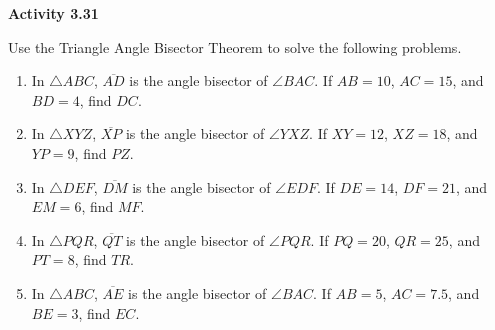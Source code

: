\vspace{0.3ex}
\noindent\textbf{Activity 3.31}

\vspace{0.2ex}

Use the Triangle Angle Bisector Theorem to solve the following problems.

\begin{enumerate}[label=\color{blue}\arabic*.]
    \item In \(\triangle ABC\), \(\overline{AD}\) is the angle bisector of \(\angle BAC\). If \(AB = 10\), \(AC = 15\), and \(BD = 4\), find \(DC\).
    \item In \(\triangle XYZ\), \(\overline{XP}\) is the angle bisector of \(\angle YXZ\). If \(XY = 12\), \(XZ = 18\), and \(YP = 9\), find \(PZ\).
    \item In \(\triangle DEF\), \(\overline{DM}\) is the angle bisector of \(\angle EDF\). If \(DE = 14\), \(DF = 21\), and \(EM = 6\), find \(MF\).
    \item In \(\triangle PQR\), \(\overline{QT}\) is the angle bisector of \(\angle PQR\). If \(PQ = 20\), \(QR = 25\), and \(PT = 8\), find \(TR\).
    \item In \(\triangle ABC\), \(\overline{AE}\) is the angle bisector of \(\angle BAC\). If \(AB = 5\), \(AC = 7.5\), and \(BE = 3\), find \(EC\).
\end{enumerate}
